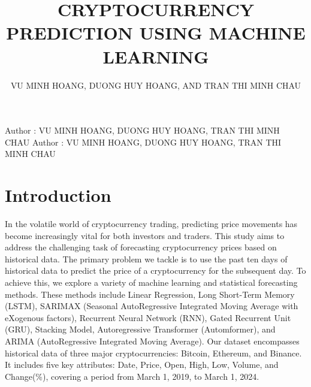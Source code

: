 \documentclass{ieeeojies}
\begin{document}
\title{CRYPTOCURRENCY PREDICTION USING MACHINE LEARNING}

\author{\uppercase{VU MINH HOANG},
\uppercase{DUONG HUY HOANG, and TRAN THI MINH CHAU}}

\address[1]{Faculty of Information Systems, University of Information Technology, 21520244@gm.uit.edu.vn}
\address[1]{Faculty of Information Systems, University of Information Technology, 21522087@gm.uit.edu.vn}
\address[1]{Faculty of Information Systems, University of Information Technology, 21521888@gm.uit.edu.vn}

\markboth
{Author \headeretal: VU MINH HOANG, DUONG HUY HOANG, TRAN THI MINH CHAU}
{Author \headeretal: VU MINH HOANG, DUONG HUY HOANG, TRAN THI MINH CHAU}

\begin{abstract}
\end{abstract}

\begin{keywords}
\end{keywords}

\titlepgskip=-15pt

\maketitle

\section{Introduction}
\label{sec:introduction}
In the volatile world of cryptocurrency trading, predicting price movements has become increasingly vital for both investors and traders. This study aims to address the challenging task of forecasting cryptocurrency prices based on historical data. The primary problem we tackle is to use the past ten days of historical data to predict the price of a cryptocurrency for the subsequent day. To achieve this, we explore a variety of machine learning and statistical forecasting methods. These methods include Linear Regression, Long Short-Term Memory (LSTM), SARIMAX (Seasonal AutoRegressive Integrated Moving Average with eXogenous factors), Recurrent Neural Network (RNN), Gated Recurrent Unit (GRU), Stacking Model, Autoregressive Transformer (Automformer), and ARIMA (AutoRegressive Integrated Moving Average). Our dataset encompasses historical data of three major cryptocurrencies: Bitcoin, Ethereum, and Binance. It includes five key attributes: Date, Price, Open, High, Low, Volume, and Change(\%), covering a period from March 1, 2019, to March 1, 2024.
\end{document}
